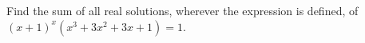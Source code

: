 Find the sum of all real solutions, wherever the expression is defined, of $(x+1)^x(x^3+3x^2+3x+1)=1$.
